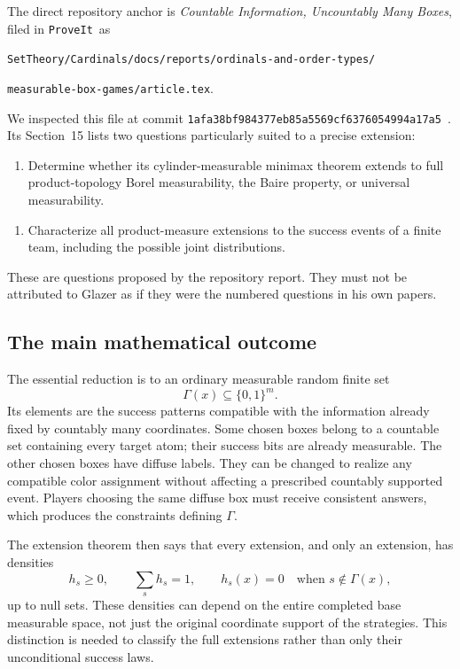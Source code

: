 \documentclass[11pt,letterpaper]{article}
\theoremstyle{definition}
\newcommand{\repo}{\texttt{ProveIt}}
\newcommand{\extsnap}{\nolinkurl{1afa38bf984377eb85a5569cf6376054994a17a5}}
\begin{document}
The direct repository anchor is \emph{Countable Information, Uncountably Many Boxes}, filed in \repo\ as
\begin{center}\small
\nolinkurl{SetTheory/Cardinals/docs/reports/ordinals-and-order-types/}\par
\nolinkurl{measurable-box-games/article.tex}.
\end{center}
We inspected this file at commit \extsnap\ \cite{ext:RepoReport,ext:ProveIt}. Its Section~15 lists two questions particularly suited to a precise extension:
\begin{enumerate}[label=\textbf{Q\arabic*.},start=2]
\item Determine whether its cylinder-measurable minimax theorem extends to full product-topology Borel measurability, the Baire property, or universal measurability.
\end{enumerate}
\begin{enumerate}[label=\textbf{Q\arabic*.},start=5]
\item Characterize all product-measure extensions to the success events of a finite team, including the possible joint distributions.
\end{enumerate}
These are questions proposed by the repository report. They must not be attributed to Glazer as if they were the numbered questions in his own papers.

\subsection{The main mathematical outcome}

The essential reduction is to an ordinary measurable random finite set
\[
\Gamma(x)\subseteq\{0,1\}^{m}.
\]
Its elements are the success patterns compatible with the information already fixed by countably many coordinates. Some chosen boxes belong to a countable set containing every target atom; their success bits are already measurable. The other chosen boxes have diffuse labels. They can be changed to realize any compatible color assignment without affecting a prescribed countably supported event. Players choosing the same diffuse box must receive consistent answers, which produces the constraints defining $\Gamma$.

The extension theorem then says that every extension, and only an extension, has densities
\[
h_s\ge0,\qquad \sum_s h_s=1,\qquad
h_s(x)=0\quad\text{when }s\notin\Gamma(x),
\]
up to null sets. These densities can depend on the entire completed base measurable space, not just the original coordinate support of the strategies. This distinction is needed to classify the full extensions rather than only their unconditional success laws.
\end{document}
